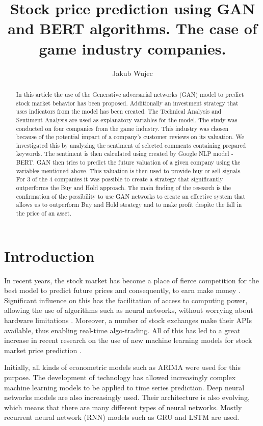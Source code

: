 \documentclass[11pt]{article} %
\title{Stock price prediction using GAN and BERT algorithms. The case of game industry companies.}
\author{Jakub Wujec}
\begin{document}
\maketitle


\begin{abstract} In this article the use of the Generative adversarial networks (GAN) model to predict stock market behavior has been proposed. Additionally an investment strategy that uses indicators from the model has been created. The Technical Analysis and Sentiment Analysis are used as explanatory variables for the model. The study was conducted on four companies from the game industry. This industry was chosen because of the potential impact of a company's customer reviews on its valuation. We investigated this by analyzing the sentiment of selected comments containing prepared keywords. The sentiment is then calculated using created by Google NLP model - BERT. GAN then tries to predict the future valuation of a given company using the variables mentioned above. This valuation is then used to provide buy or sell signals. For 3 of the 4 companies it was possible to create a strategy that significantly outperforms the Buy and Hold approach. The main finding of the research is the confirmation of the possibility to use GAN networks to create an effective system that allows us to outperform Buy and Hold strategy and to make profit despite the fall in the price of an asset.
\end{abstract}

\section{Introduction}
In recent years, the stock market has become a place of fierce competition for the best model to predict future prices and consequently, to earn make money \cite{ml-in-stock}. 
Significant influence on this has the facilitation of access to computing power, allowing the use of algorithms such as neural networks, without worrying about hardware limitations \cite{ml-compute}. Moreover, a number of stock exchanges make their APIs available, thus enabling real-time algo-trading. All of this has led to a great increase in recent research on the use of new machine learning models for stock market price prediction \cite{ml-studies}.  

Initially, all kinds of econometric models such as ARIMA were used for this purpose. The development of technology has allowed increasingly complex machine learning models to be applied to time series prediction. Deep neural networks models are also increasingly used. Their architecture is also evolving, which means that there are many different types of neural networks. Mostly recurrent neural network (RNN) models such as GRU and LSTM are used. 
\end{document}
